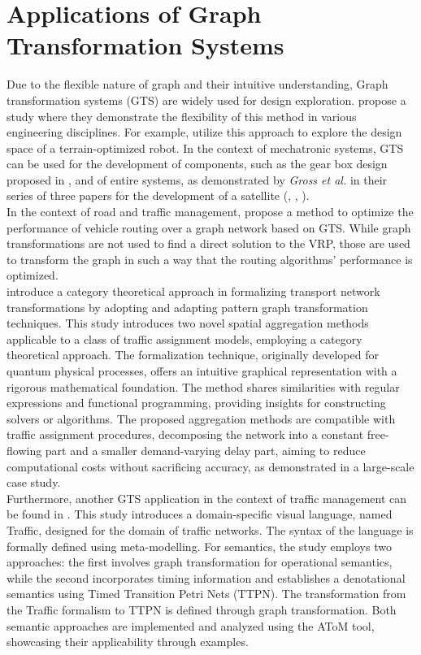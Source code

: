 \section{Applications of Graph Transformation Systems }\label{sec:app_gts}
Due to the flexible nature of graph and their intuitive understanding, Graph transformation systems (GTS) are widely used for design exploration.  propose a study where they demonstrate the flexibility of this method in various engineering disciplines. For example,  utilize this approach to explore the design space of a terrain-optimized robot. In the context of mechatronic systems, GTS can be used for the development of components, such as the gear box design proposed in , and of entire systems, as demonstrated by \textit{Gross et al.} in their series of three papers for the development of a satellite (\cite{gross2016a}, \cite{gross2016b}, \cite{gross2016c}). \\
In the context of road and traffic management,  propose a method to optimize the performance of vehicle routing over a graph network based on GTS. While graph transformations are not used to find a direct solution to the VRP, those are used to transform the graph in such a way that the routing algorithms' performance is optimized. \\
introduce a category theoretical approach in formalizing transport network transformations by adopting and adapting pattern
graph transformation techniques. This study introduces two novel spatial aggregation methods applicable to a class of traffic assignment models, employing a category theoretical approach. The formalization technique, originally developed for quantum physical processes, offers an intuitive graphical representation with a rigorous mathematical foundation. The method shares similarities with regular expressions and functional programming, providing insights for constructing solvers or algorithms. The proposed aggregation methods are compatible with traffic assignment procedures, decomposing the network into a constant free-flowing part and a smaller demand-varying delay part, aiming to reduce computational costs without sacrificing accuracy, as demonstrated in a large-scale case study.\\
Furthermore, another GTS application in the context of traffic management can be found in . This study introduces a domain-specific visual language, named Traffic, designed for the domain of traffic networks. The syntax of the language is formally defined using meta-modelling. For semantics, the study employs two approaches: the first involves graph transformation for operational semantics, while the second incorporates timing information and establishes a denotational semantics using Timed Transition Petri Nets (TTPN). The transformation from the Traffic formalism to TTPN is defined through graph transformation. Both semantic approaches are implemented and analyzed using the AToM tool, showcasing their applicability through examples.

 
